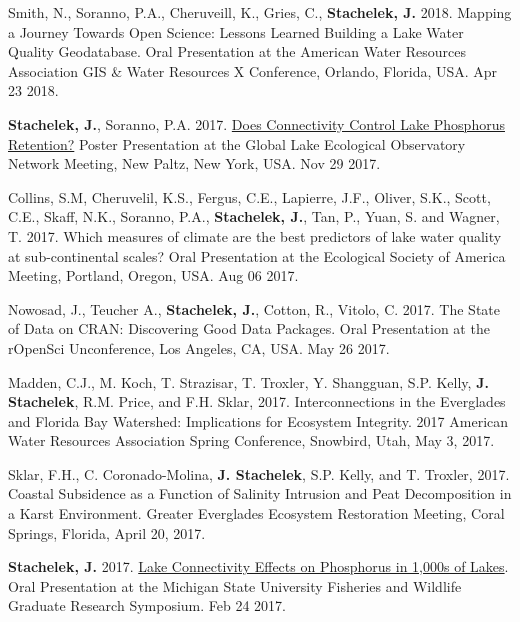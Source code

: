 \documentclass[11pt]{article}
\makeatletter
\newlength{\bibhang}
\newlength{\bibsep}
 {\@listi \global\bibsep\itemsep \global\advance\bibsep by\parsep}
\newenvironment{bibenum*}
  {\renewcommand\labelenumi{[\theenumi]}%
   \etaremune[
     topsep=0pt,
     itemsep=\bibsep,
     parsep=0pt,partopsep=0pt,
     itemindent=-\bibhang,
     leftmargin={\bibhang+\widthof{[999]}}]}
  {\endetaremune}
\makeatother
\begin{document}
\begin{bibenum*}
  \item Smith, N., Soranno, P.A., Cheruveill, K., Gries, C., \textbf{Stachelek, J.} 2018. Mapping a Journey Towards Open Science: Lessons Learned Building a Lake Water Quality Geodatabase. Oral Presentation at the American Water Resources Association GIS \& Water Resources X Conference, Orlando, Florida, USA. Apr 23 2018.

  \item \textbf{Stachelek, J.}, Soranno, P.A. 2017. \href{https://doi.org/10.6084/m9.figshare.9638735.v1}{Does Connectivity Control Lake Phosphorus Retention?} Poster Presentation at the Global Lake Ecological Observatory Network Meeting, New Paltz, New York, USA. Nov 29 2017.

  \item Collins, S.M, Cheruvelil, K.S., Fergus, C.E., Lapierre, J.F., Oliver, S.K., Scott, C.E., Skaff, N.K., Soranno, P.A., \textbf{Stachelek, J.}, Tan, P., Yuan, S. and Wagner, T. 2017. Which measures of climate are the best predictors of lake water quality at sub-continental scales? Oral Presentation at the Ecological Society of America Meeting, Portland, Oregon, USA. Aug 06 2017.

  \item Nowosad, J., Teucher A., \textbf{Stachelek, J.}, Cotton, R., Vitolo, C. 2017. The State of Data on CRAN: Discovering Good Data Packages. Oral Presentation at the rOpenSci Unconference, Los Angeles, CA, USA. May 26 2017.

  \item Madden, C.J., M. Koch, T. Strazisar, T. Troxler, Y. Shangguan, S.P. Kelly, \textbf{J. Stachelek}, R.M. Price, and F.H. Sklar, 2017. Interconnections in the Everglades and Florida Bay Watershed: Implications for Ecosystem Integrity. 2017 American Water Resources Association Spring Conference, Snowbird, Utah, May 3, 2017.

  \item Sklar, F.H., C. Coronado-Molina, \textbf{J. Stachelek}, S.P. Kelly, and T. Troxler, 2017. Coastal Subsidence as a Function of Salinity Intrusion and Peat Decomposition in a Karst Environment. Greater Everglades Ecosystem Restoration Meeting, Coral Springs, Florida, April 20, 2017.

  \item \textbf{Stachelek, J.} 2017. \href{https://doi.org/10.6084/m9.figshare.8187038.v1}{Lake Connectivity Effects on Phosphorus in 1,000s of Lakes}. Oral Presentation at the Michigan State University Fisheries and Wildlife Graduate Research Symposium. Feb 24 2017.


\end{bibenum*}
\end{document}
